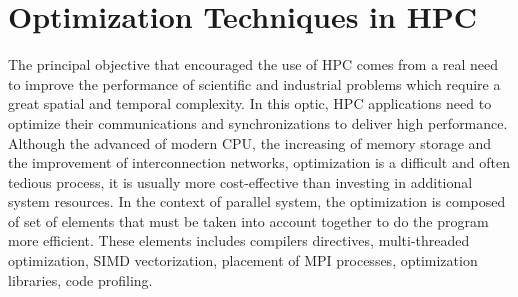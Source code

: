 \section{Optimization Techniques in HPC} \label{optimization}
The principal objective that encouraged the use of HPC comes from a real need to improve the performance of scientific and industrial problems which require a great spatial and temporal complexity. In this optic, HPC applications need to optimize their communications and synchronizations to deliver high performance. Although the advanced of modern CPU, the increasing of memory storage and the improvement of interconnection networks, optimization is a difficult and often tedious process, it is usually more cost-effective than investing in additional system resources. In the context of parallel system, the optimization is composed of set of elements that must be taken into account together to do the program more efficient. These elements includes compilers directives, multi-threaded optimization, SIMD vectorization, placement of MPI processes, optimization libraries, code profiling.

